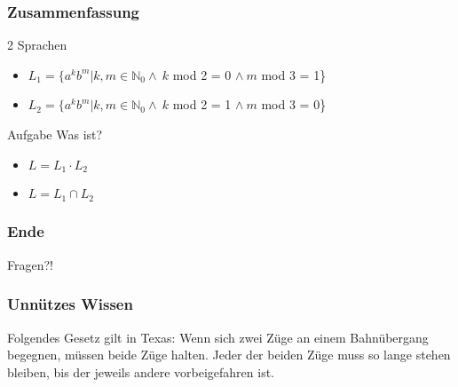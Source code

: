 \documentclass{beamer}
\begin{document}
\begin{frame}
	\frametitle{Zusammenfassung}
	\begin{block}{2 Sprachen}
		\begin{itemize}
			\item $L_{1} = \{a^{k}b^{m}|k,m \in \mathbb N_{0} \land \ k$ mod 2 = 0 $\land
\ m$ mod 3 = 1\}
			\item $L_{2} = \{a^{k}b^{m}|k,m \in \mathbb N_{0} \land \ k$ mod 2 = 1 $\land
\ m$ mod 3 = 0\}
		\end{itemize}
	\end{block}
	\begin{block}{Aufgabe}
		Was ist?
		\begin{itemize}
			\item $ L = L_1 \cdot L_2$
			\item $ L = L_1 \cap L_2$
		\end{itemize}
	\end{block}
\end{frame}

\begin{frame}
	\frametitle {Ende}
	\begin{center}
		Fragen?! \\
	\end{center}
\end{frame}

\begin{frame}
	\frametitle{Unnützes Wissen}
	\begin{block}{}
		\begin{center}
			Folgendes Gesetz gilt in Texas: Wenn sich zwei Züge an 					einem Bahnübergang begegnen, müssen beide Züge halten. 					Jeder der beiden Züge muss so lange stehen bleiben, bis 				der jeweils andere vorbeigefahren ist.
		\end{center}
	\end{block}{}
\end{frame}
\end{document}
